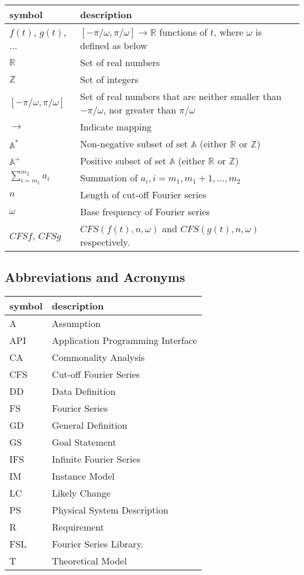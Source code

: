 \documentclass[12pt]{article}
\newcommand{\famname}{FSL} %
\begin{document}
\renewcommand{\arraystretch}{1.2}
\noindent \begin{longtable*}{l l p{12cm}} \toprule
\textbf{symbol} & \textbf{description}\\
\midrule 
$f(t)$, $g(t)$, ... & $[-\pi/\omega, \pi/\omega]\rightarrow\mathbb{R}$ 
functions of $t$, where $\omega$ is defined as below\\
$\mathbb{R}$ & Set of real numbers\\
$\mathbb{Z}$ & Set of integers\\
$[-\pi/\omega, \pi/\omega]$ & Set of real numbers that are neither smaller 
than $-\pi/\omega$, nor greater than $\pi/\omega$ \\
$\rightarrow$ & Indicate mapping\\
$\mathbb{A}^{*}$ & Non-negative subset of set $\mathbb{A}$ (either $\mathbb{R}$ 
or $\mathbb{Z}$)\\
$\mathbb{A}^{+}$ & Positive subset of set $\mathbb{A}$ (either $\mathbb{R}$ 
or $\mathbb{Z}$)\\
$\sum_{i=m_1}^{m_2}a_i$ & Summation of $a_i, i=m_1, m_1+1, ..., m_2$\\
$n$ & Length of cut-off Fourier series\\ 
$\omega$ & Base frequency of Fourier series \\
$\mathit{CFSf}$, $\mathit{CFSg}$ & $\mathit{CFS}(f(t), n, \omega)$ and 
$\mathit{CFS}(g(t), n, \omega)$ respectively.\\
\bottomrule
\end{longtable*}

\subsection{Abbreviations and Acronyms}

\renewcommand{\arraystretch}{1.2}
\begin{tabular}{l l} 
  \toprule		
  \textbf{symbol} & \textbf{description}\\
  \midrule 
  A & Assumption\\
  API & Application Programming Interface\\
  CA & Commonality Analysis\\
  CFS & Cut-off Fourier Series\\
  DD & Data Definition\\
  FS & Fourier Series\\
  GD & General Definition\\
  GS & Goal Statement\\
  IFS & Infinite Fourier Series\\
  IM & Instance Model\\
  LC & Likely Change\\
  PS & Physical System Description\\
  R & Requirement\\
  \famname{} & Fourier Series Library.\\
  T & Theoretical Model\\
  \bottomrule
\end{tabular}\\
\end{document}
